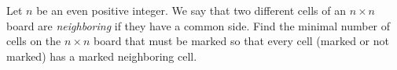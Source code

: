 Let $n$ be an even positive integer. We say that two different cells of an $n \times n$ board are \emph{neighboring} if they have a common side. Find the minimal number of cells on the $n \times n$ board that must be marked so that every cell (marked or not marked) has a marked neighboring cell.

